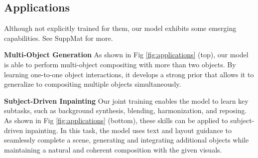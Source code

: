 \vspace{-2mm}
\subsection{Applications}

Although not explicitly trained for them, our model exhibits some emerging capabilities. See SuppMat for more.

\textbf{Multi-Object Generation} As shown in Fig \ref{fig:applications} (top), our model is able to perform multi-object compositing with more than two objects. By learning one-to-one object interactions, it develops a strong prior that allows it to generalize to compositing multiple objects simultaneously. %

\textbf{Subject-Driven Inpainting} Our joint training enables the model to learn key subtasks, such as background synthesis, blending, harmonization, and reposing. As shown in Fig \ref{fig:applications} (bottom), these skills can be applied to subject-driven inpainting. In this task, the model uses text and layout guidance to seamlessly complete a scene, generating and integrating additional objects while maintaining a natural and coherent composition with the given visuals. %

